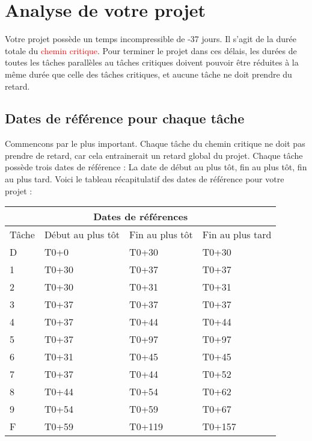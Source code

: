 \documentclass{article}
\begin{document}
\section{Analyse de votre projet}
Votre projet possède un temps incompressible de -37 jours.
    Il s'agit de la durée totale du \textcolor{red}{chemin critique}.
    Pour terminer le projet dans ces délais, les durées de toutes les tâches parallèles au tâches critiques doivent pouvoir être réduites
    à la même durée que celle des tâches critiques, et aucune tâche ne doit prendre du retard.\subsection{Dates de référence pour chaque tâche}Commencons par le plus important. Chaque tâche du chemin critique ne doit pas prendre de
    retard, car cela entrainerait un retard global du projet.
    Chaque tâche possède trois dates de référence : La date de début au plus tôt,
    fin au plus tôt, fin au plus tard.
    Voici le tableau récapitulatif des dates de référence pour votre projet :\newline 
\begin{tabular}{ |p{3cm}||p{3cm}|p{3cm}|p{3cm}|  }
        \hline
        \multicolumn{4}{|c|}{Dates de références} \\
        \hline 
        Tâche&Début au plus tôt&Fin au plus tôt&Fin au plus tard \\ 
        \hline 
 D&T0+0&T0+30&T0+30 \\ 
 1&T0+30&T0+37&T0+37 \\ 
 2&T0+30&T0+31&T0+31 \\ 
 3&T0+37&T0+37&T0+37 \\ 
 4&T0+37&T0+44&T0+44 \\ 
 5&T0+37&T0+97&T0+97 \\ 
 6&T0+31&T0+45&T0+45 \\ 
 7&T0+37&T0+44&T0+52 \\ 
 8&T0+44&T0+54&T0+62 \\ 
 9&T0+54&T0+59&T0+67 \\ 
 F&T0+59&T0+119&T0+157 \\ 
\hline
    \end{tabular} 
\end{document}
